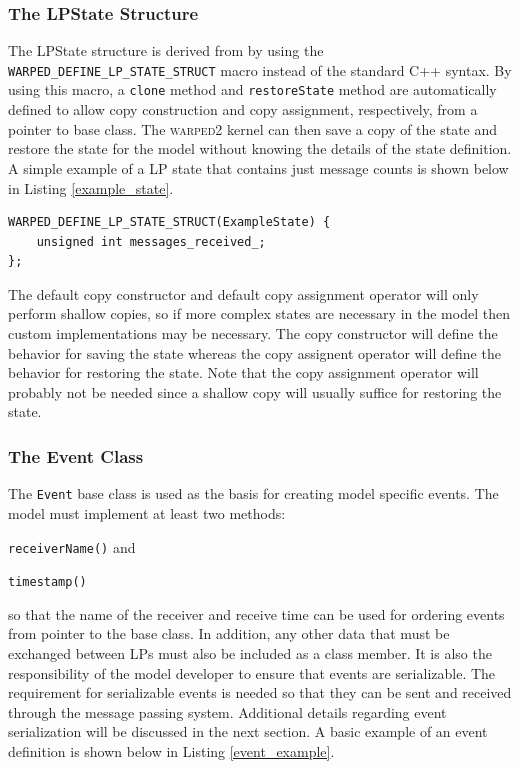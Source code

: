 \documentclass[11pt]{book}
\begin{document}
\subsubsection{The LPState Structure}

The LPState structure is derived from by using the \texttt{WARPED\_DEFINE\_LP\_STATE\_STRUCT} macro
instead of the standard C++ syntax.  By using this macro, a \texttt{clone} method and
\texttt{restoreState} method are automatically defined to allow copy construction and copy
assignment, respectively, from a pointer to base class.  The \textsc{warped2} kernel can then save a
copy of the state and restore the state for the model without knowing the details of the state
definition.  A simple example of a LP state that contains just message counts is shown below in
Listing \ref{example_state}.

\begin{lstlisting}[caption=Example \textsc{warped2} State Definition, label=example_state, float]
WARPED_DEFINE_LP_STATE_STRUCT(ExampleState) {
    unsigned int messages_received_;
};
\end{lstlisting}

The default copy constructor and default copy assignment operator will only perform shallow copies,
so if more complex states are necessary in the model then custom implementations may be necessary.
The copy constructor will define the behavior for saving the state whereas the copy assignent
operator will define the behavior for restoring the state.  Note that the copy assignment operator
will probably not be needed since a shallow copy will usually suffice for restoring the state.

\subsubsection{The Event Class}

The \texttt{Event} base class is used as the basis for creating model specific events.  The model
must implement at least two methods: \begin{inparaenum}[(1)] \item \texttt{receiverName()} and 
\item \texttt{timestamp()} \end{inparaenum} so that the name of the receiver and receive time can be
used for ordering events from pointer to the base class.  In addition, any other data that must be
exchanged between LPs must also be included as a class member.  It is also the responsibility of the
model developer to ensure that events are serializable.  The requirement for serializable events is
needed so that they can be sent and received through the message passing system.  Additional details
regarding event serialization will be discussed in the next section.  A basic example of an event
definition is shown below in Listing \ref{event_example}.
\end{document}
